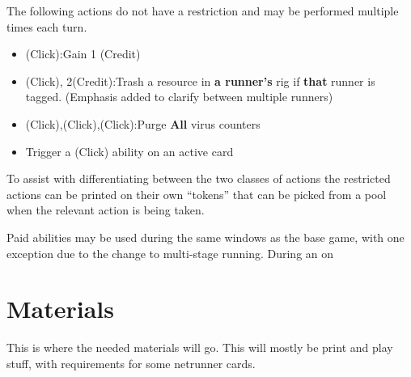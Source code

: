 \documentclass[titlepage]{article}
\begin{document}
The following actions do not have a restriction and may be performed multiple times each turn.

\begin{itemize}
	\item (Click):Gain 1 (Credit)
	\item (Click), 2(Credit):Trash a resource in \textbf{a runner's} rig if \textbf{that} runner is tagged. (Emphasis added to clarify between multiple runners)
	\item (Click),(Click),(Click):Purge \textbf{All} virus counters
	\item Trigger a (Click) ability on an active card
\end{itemize}

To assist with differentiating between the two classes of actions the restricted actions can be printed on their own ``tokens'' that can be picked from a pool when the relevant action is being taken.

Paid abilities may be used during the same windows as the base game, with one exception due to the change to multi-stage running. During an on
\section{Materials}
This is where the needed materials will go. This will mostly be print and play stuff, with requirements for some netrunner cards.
\end{document}
